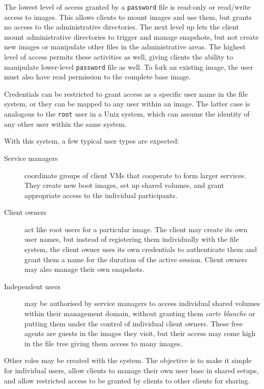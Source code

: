 The lowest level of access granted by a \texttt{password} file is read-only or read/write access to images. This allows clients to mount images and use them, but grants no access to the administrative directories. The next level up lets the client mount administrative directories to trigger and manage snapshots, but not create new images or manipulate other files in the administrative areas. The highest level of access permits these activities as well, giving clients the ability to manipulate lower-level \texttt{password} file as well. To fork an existing image, the user must also have read permission to the complete base image.

Credentials can be restricted to grant access as a specific user name in the file system, or they can be mapped to any user within an image. The latter case is analogous to the \texttt{root} user in a Unix system, which can assume the identity of any other user within the same system.

With this system, a few typical user types are expected:

\begin{description}
\item[Service managers] coordinate groups of client VMs that cooperate to form larger services. They create new boot images, set up shared volumes, and grant appropriate access to the individual participants.

\item[Client owners] act like root users for a particular image. The client may create its own user names, but instead of registering them individually with the file system, the client owner uses its own credentials to authenticate them and grant them a name for the duration of the active session. Client owners may also manage their own snapshots.

\item[Independent users] may be authorised by service managers to access individual shared volumes within their management domain, without granting them \emph{carte blanche} or putting them under the control of individual client owners. These free agents are guests in the images they visit, but their access may come high in the file tree giving them access to many images.
\end{description}

Other roles may be created with the system. The objective is to make it simple for individual users, allow clients to manage their own user base in shared setups, and allow restricted access to be granted by clients to other clients for sharing.


